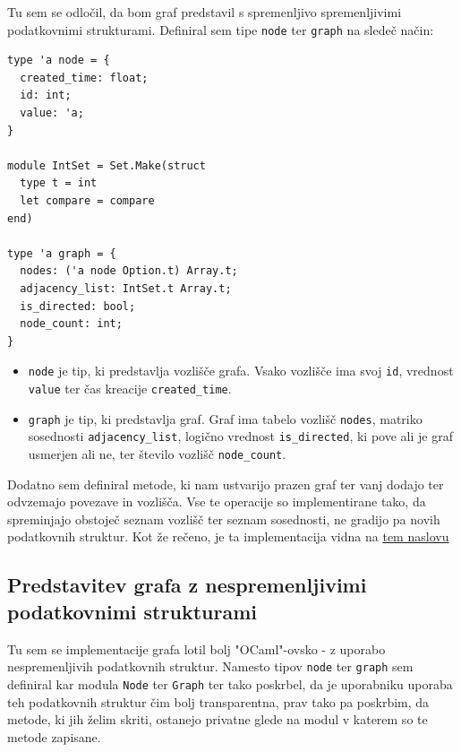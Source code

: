 \documentclass[mat1, tisk]{fmfdelo}
\begin{document}
Tu sem se odločil, da bom graf predstavil s spremenljivo spremenljivimi podatkovnimi strukturami. Definiral sem tipe \texttt{node} ter \texttt{graph} na sledeč način:

\begin{lstlisting}
type 'a node = {
  created_time: float;
  id: int;
  value: 'a;
}

module IntSet = Set.Make(struct
  type t = int
  let compare = compare
end)

type 'a graph = {
  nodes: ('a node Option.t) Array.t;
  adjacency_list: IntSet.t Array.t;
  is_directed: bool;
  node_count: int;
}
\end{lstlisting}

\begin{itemize}
  \item \texttt{node} je tip, ki predstavlja vozlišče grafa. Vsako vozlišče ima svoj \texttt{id}, vrednost \texttt{value} ter čas kreacije \texttt{created\_time}.
  \item \texttt{graph} je tip, ki predstavlja graf. Graf ima tabelo vozlišč \texttt{nodes}, matriko sosednosti \texttt{adjacency\_list}, 
        logično vrednost \texttt{is\_directed}, ki pove ali je graf usmerjen ali ne, ter število vozlišč \texttt{node\_count}.
\end{itemize}

Dodatno sem definiral metode, ki nam ustvarijo prazen graf ter vanj dodajo ter odvzemajo povezave in vozlišča. Vse te operacije so implementirane tako, da spreminjajo obstoječ seznam
vozlišč ter seznam sosednosti, ne gradijo pa novih podatkovnih struktur. Kot že rečeno, je ta implementacija vidna na 
\href{https://github.com/tjazerzen/parallelisation-of-graph-algorithms-in-functional-programming-languages/blob/predstavitev_grafa_z_arrayi_ter_mnozicami/playground/graph/graph.ml}{tem naslovu}

\subsection{Predstavitev grafa z nespremenljivimi podatkovnimi strukturami} \label{sec:predstavitev_grafa_z_nespremenljivimi_podatkovnimi_strukturami}

Tu sem se implementacije grafa lotil bolj "OCaml"-ovsko - z uporabo nespremenljivih podatkovnih struktur. Namesto tipov \texttt{node} ter \texttt{graph}
sem definiral kar modula \texttt{Node} ter \texttt{Graph} ter tako poskrbel, da je uporabniku uporaba teh podatkovnih struktur čim bolj transparentna, prav tako
pa poskrbim, da metode, ki jih želim skriti, ostanejo privatne glede na modul v katerem so te metode zapisane.
\end{document}
